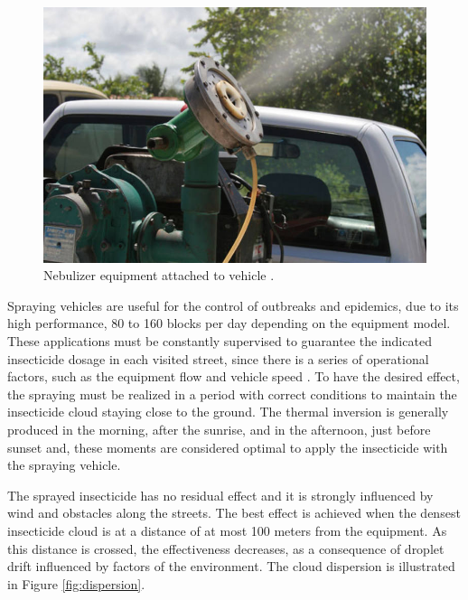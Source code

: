 \documentclass[a4paper,11pt]{article}
\begin{document}
\begin{figure}[!ht]
  \centering
    \includegraphics[scale=0.5]{fumace.jpg}
    \caption{Nebulizer equipment attached to vehicle \citep{fumace-2022}.}
    \label{fig:nebulizer}
\end{figure}

Spraying vehicles are useful for the  control of outbreaks and epidemics, due to
its high performance, 80 to 160 blocks per day depending on the equipment model.
These  applications must  be constantly  supervised to  guarantee the  indicated
insecticide  dosage  in  each  visited  street,  since  there  is  a  series  of
operational   factors,  such   as   the  equipment   flow   and  vehicle   speed
\citep{brasil-dept-helth:2009}. To have the desired effect, the spraying must be
realized in a  period with correct conditions to maintain  the insecticide cloud
staying close to the ground. The  thermal inversion is generally produced in the
morning, after the sunrise, and in  the afternoon, just before sunset and, these
moments  are considered  optimal  to  apply the  insecticide  with the  spraying
vehicle.

The sprayed insecticide has no residual  effect and it is strongly influenced by
wind  and obstacles  along the  streets. The  best effect  is achieved  when the
densest  insecticide cloud  is at  a distance  of at  most 100  meters from  the
equipment.  As this  distance  is  crossed, the  effectiveness  decreases, as  a
consequence of droplet drift influenced by factors of the environment. The cloud
dispersion is illustrated in Figure \ref{fig:dispersion}.
\end{document}

